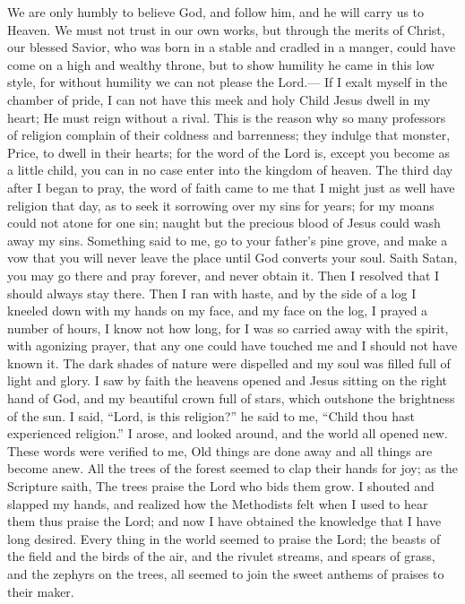 We are only humbly to believe God, and follow him, and he will carry us to Heaven.
We must not trust in our own works, but through the merits of Christ, our blessed Savior, who was born in a stable and cradled in a manger, could have come on a high and wealthy throne, but to show humility he came in this low style, for without humility we can not please the Lord.---%
If I exalt myself in the chamber of pride, I can not have this meek and holy Child Jesus dwell in my heart; He must reign without a rival.
This is the reason why so many professors of religion complain of their coldness and barrenness; they indulge that monster, Price, to dwell in their hearts; for the word of the Lord is, except you become as a little child, you can in no case enter into the kingdom of heaven.
The third day after I began to pray, the word of faith came to me that I might just as well have religion that day, as to seek it sorrowing over my sins for years; for my moans could not atone for one sin; naught but the precious blood of Jesus could wash away my sins.
Something said to me, go to your father's pine grove, and make a vow that you will never leave the place until God converts your soul.
Saith Satan, you may go there and pray forever, and never obtain it.
Then I resolved that I should always stay there.
Then I ran with haste, and by the side of a log I kneeled down with my hands on my face, and my face on the log, I prayed a number of hours, I know not how long, for I was so carried away with the spirit, with agonizing prayer, that any one could have touched me and I should not have known it.
The dark shades of nature were dispelled and my soul was filled full of light and glory.
I saw by faith the heavens opened and Jesus sitting on the right hand of God, and my beautiful crown full of stars, which outshone the brightness of the sun.
I said, ``Lord, is this religion?'' he said to me, ``Child thou hast experienced religion.''
I arose, and looked around, and the world all opened new.
These words were verified to me, Old things are done away and all things are become anew.
All the trees of the forest seemed to clap their hands for joy; as the Scripture saith, The trees praise the Lord who bids them grow.
I shouted and slapped my hands, and realized how the Methodists felt when I used to hear them thus praise the Lord; and now I have obtained the knowledge that I have long desired.
Every thing in the world seemed to praise the Lord; the beasts of the field and the birds of the air, and the rivulet streams, and spears of grass, and the zephyrs on the trees, all seemed to join the sweet anthems of praises to their maker.
